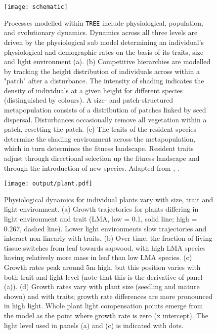 \documentclass[a4paper,11pt]{article}
\begin{document}
\begin{figure}[h!]
\centering
\texttt{[image: schematic]}

\caption{Processes modelled within \texttt{TREE} include physiological, population, and
evolutionary dynamics.
Dynamics across all three levels are driven by the
physiological sub model determining an individual's physiological and
demographic rates on the basis of its traits, size and light environment (a).
(b) Competitive hierarchies  are modelled by tracking the height distribution of
individuals across within a "patch" after a disturbance. The intensity
of shading indicates the density of individuals at a given height for
different species (distinguished by colours). A size- and patch-structured
metapopulation consists of a distribution of patches linked by seed dispersal.
Disturbances occasionally remove all vegetation within a patch, resetting the
patch. (c) The traits of the resident species determine the shading environment
across the metapopulation, which in turn determines the fitness landscape.
Resident traits adjust through directional selection up the fitness landscape
and through the introduction of new species. Adapted from
\citet{Falster-2011}, \citet{Falster-2015}. }

\label{fig:schematic}
\end{figure}

\newpage

\begin{figure}[h!]
\centering
\texttt{[image: output/plant.pdf]}
\caption{Physiological dynamics for individual plants vary with size, trait
and light environment. (a) Growth trajectories for plants differing in light
environment and trait (LMA, low = 0.1, solid line; high =  0.267, dashed
line). Lower light environments slow trajectories and interact non-linearly
with traits. (b) Over time, the fraction of living tissue switches from leaf
towards sapwood, with high LMA species having relatively more mass in leaf
than low LMA species. (c) Growth rates peak around 5m high, but this position
varies with both trait and light level (note that this is the derivative of
panel (a)). (d) Growth rates vary with plant size (seedling and mature shown)
and with traits; growth rate differences are more pronounced in high light.
Whole plant light compensation points emerge from the model as the point where
growth rate is zero (x intercept).  The light level used in panels (a) and (c)
is indicated with dots.}
\label{fig:plant}
\end{figure}
\end{document}
